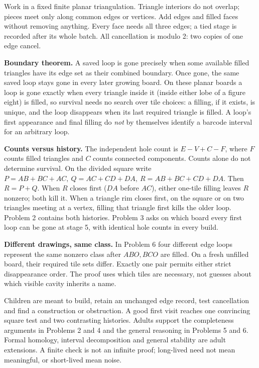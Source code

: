 \documentclass[10pt,letterpaper]{article}
\newcommand{\sectiontitle}[1]{\par\vspace{5pt}{\bfseries\fontsize{12}{14}\selectfont #1}\par\nopagebreak}
\begin{document}
\sectiontitle{Mathematical destination: facts and limits}
Work in a fixed finite planar triangulation. Triangle interiors do not overlap; pieces meet only along common edges or vertices. Add edges and filled faces without removing anything. Every face needs all three edges; a tied stage is recorded after its whole batch. All cancellation is modulo 2: two copies of one edge cancel.

\textbf{Boundary theorem.} A saved loop is gone precisely when some available filled triangles have its edge set as their combined boundary. Once gone, the same saved loop stays gone in every later growing board. On these planar boards a loop is gone exactly when every triangle inside it (inside either lobe of a figure eight) is filled, so survival needs no search over tile choices: a filling, if it exists, is unique, and the loop disappears when its last required triangle is filled. A loop's first appearance and final filling do \emph{not} by themselves identify a barcode interval for an arbitrary loop.

\textbf{Counts versus history.} The independent hole count is \(E-V+C-F\), where \(F\) counts filled triangles and \(C\) counts connected components. Counts alone do not determine survival. On the divided square write
\(P=AB+BC+AC,\ Q=AC+CD+DA,\ R=AB+BC+CD+DA\).
Then \(R=P+Q\). When \(R\) closes first (\(DA\) before \(AC\)), either one-tile filling leaves \(R\) nonzero; both kill it. When a triangle rim closes first, on the square or on two triangles meeting at a vertex, filling that triangle first kills the older loop. Problem 2 contains both histories. Problem 3 asks on which board every first loop can be gone at stage 5, with identical hole counts in every build.

\textbf{Different drawings, same class.} In Problem 6 four different edge loops represent the same nonzero class after \(ABO,BCO\) are filled. On a fresh unfilled board, their required tile sets differ. Exactly one pair permits either strict disappearance order. The proof uses which tiles are necessary, not guesses about which visible cavity inherits a name.

Children are meant to build, retain an unchanged edge record, test cancellation and find a construction or obstruction. A good first visit reaches one convincing square test and two contrasting histories. Adults support the completeness arguments in Problems 2 and 4 and the general reasoning in Problems 5 and 6. Formal homology, interval decomposition and general stability are adult extensions. A finite check is not an infinite proof; long-lived need not mean meaningful, or short-lived mean noise.
\end{document}
